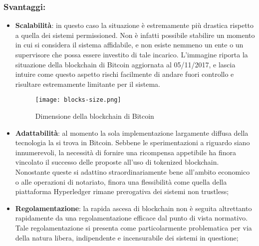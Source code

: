 		\subsubsection{Svantaggi:}
			\begin{itemize}
				\item \textbf{Scalabilità}: in questo caso la situazione è estremamente più drastica rispetto a quella dei sistemi permissioned. Non è infatti possibile stabilire un momento in cui si considera il sistema affidabile, e non esiste nemmeno un ente o un supervisore che possa essere investito di tale incarico. L'immagine riporta la situazione della blockchain di Bitcoin aggiornata al 05/11/2017, e lascia intuire come questo aspetto rischi facilmente di andare fuori controllo e risultare estremamente limitante per il sistema.
				\begin{figure}[ht]
					\centering
					\texttt{[image: blocks-size.png]}
					\caption{Dimensione della blockchain di Bitcoin}
					\label{fig:blocks.size}
				\end{figure}
				\item \textbf{Adattabilità}: al momento la sola implementazione largamente diffusa della tecnologia la si trova in Bitcoin. Sebbene le sperimentazioni a riguardo siano innumerevoli, la necessità di fornire una ricompensa appetibile ha finora vincolato il successo delle proposte all'uso di tokenized blockchain. Nonostante queste si adattino straordinariamente bene all'ambito economico o alle operazioni di notariato, finora una flessibilità come quella della piattaforma Hyperledger rimane prerogativa dei sistemi non trustless;
				\item \textbf{Regolamentazione}: la rapida ascesa di blockchain non è seguita altrettanto rapidamente da una regolamentazione efficace dal punto di vista normativo. Tale regolamentazione si presenta come particolarmente problematica per via della natura libera, indipendente e incensurabile dei sistemi in questione;

\end{itemize}

